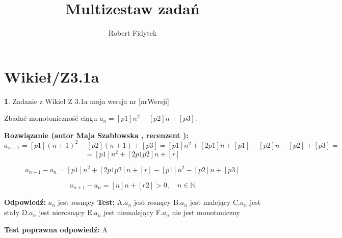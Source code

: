 \documentclass[12pt, a4paper]{article}
\title{Multizestaw zadań}
\author{Robert Fidytek}
\date{}
\theoremstyle{definition} %
\newtheorem{zad}{}
\newcommand{\kategoria}[1]{\section{#1}} %
\newcommand{\zadStart}[1]{\begin{zad}#1\newline} %
\newcommand{\zadStop}{\end{zad}}   %
\newcommand{\rozwStart}[2]{\noindent \textbf{Rozwiązanie (autor #1 , recenzent #2): }\newline} %
\newcommand{\rozwStop}{\newline}                                            %
\newcommand{\odpStart}{\noindent \textbf{Odpowiedź:}\newline}    %
\newcommand{\odpStop}{\newline}                                             %
\newcommand{\testStart}{\noindent \textbf{Test:}\newline} %
\newcommand{\testStop}{\newline} %
\newcommand{\kluczStart}{\noindent \textbf{Test poprawna odpowiedź:}\newline} %
\newcommand{\kluczStop}{\newline} %
\begin{document}
\maketitle


\kategoria{Wikieł/Z3.1a}
\zadStart{Zadanie z Wikieł Z 3.1a moja wersja nr [nrWersji]}


Zbadać monotoniczność ciągu $a_{n}=[p1]n^{2}-[p2]n+[p3]$.

\zadStop

\rozwStart{Maja Szabłowska}{}
$$a_{n+1}=[p1](n+1)^{2}-[p2](n+1)+[p3]=[p1]n^{2}+[2p1]n+[p1]-[p2]n-[p2]+[p3]=$$
$$=[p1]n^{2}+[2p1p2]n+[r]$$

$$a_{n+1}-a_{n}=[p1]n^{2}+[2p1p2]n+[r]-[p1]n^{2}-[p2]n+[p3]$$

$$a_{n+1}-a_{n}=[n]n+[r2] >0, \quad n\in\mathbb{N}$$


\rozwStop


\odpStart
$a_{n}$ jest rosnący
\odpStop
\testStart
A.$a_{n}$ jest rosnący
B.$a_{n}$ jest malejący
C.$a_{n}$ jest stały
D.$a_{n}$ jest nierosnący
E.$a_{n}$ jest niemalejący
F.$a_{n}$ nie jest monotoniczny


\testStop
\kluczStart
A
\kluczStop
\end{document}
